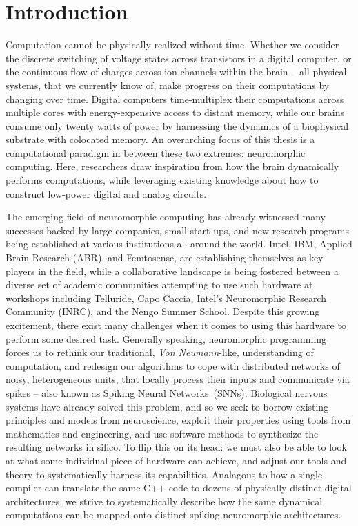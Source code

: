 \chapter{Introduction}

Computation cannot be physically realized without time.
Whether we consider the discrete switching of voltage states across transistors in a
digital computer,
or the continuous flow of charges across ion channels within the brain -- 
all physical systems, that we currently know of, make progress on their computations
by changing over time.
Digital computers time-multiplex their computations across multiple cores with energy-expensive access to distant memory, while our brains consume only twenty watts of power by harnessing the dynamics of a biophysical substrate with colocated memory.
An overarching focus of this thesis is a computational paradigm
in between these two extremes: neuromorphic computing.
Here, researchers draw inspiration from how the
brain dynamically performs computations, while leveraging existing knowledge about
how to construct low-power digital and analog circuits.

The emerging field of neuromorphic computing has already
witnessed many successes backed by large companies, small start-ups, and new research
programs being established at various institutions all around the world.
Intel, IBM, Applied Brain Research (ABR), and Femtosense, are establishing themselves as key players in the field, while a collaborative landscape is being fostered between a diverse set of academic communities attempting to use such hardware at workshops including Telluride, Capo Caccia, Intel's Neuromorphic Research Community (INRC), and the Nengo Summer School.
Despite this growing excitement, there exist many challenges when it comes to using
this hardware to perform some desired task.
Generally speaking, neuromorphic programming forces us to rethink our traditional,
\emph{Von Neumann}-like, understanding of computation, and redesign our algorithms to cope with distributed networks of noisy, heterogeneous units, that locally process their inputs and communicate via spikes -- also known as Spiking Neural Networks~(SNNs).
Biological nervous systems have already solved this problem, and so we seek to borrow existing
principles and models from neuroscience, exploit their properties using tools from mathematics and engineering,
and use software methods to synthesize the resulting networks in silico.
To flip this on its head: we must also be able to look at what some individual piece of hardware can achieve,
and adjust our tools and theory to systematically harness its capabilities.
Analagous to how a single compiler can translate the same C++ code
to dozens of physically distinct digital architectures, we strive to systematically describe
how the same dynamical computations can be mapped onto distinct spiking neuromorphic architectures.

